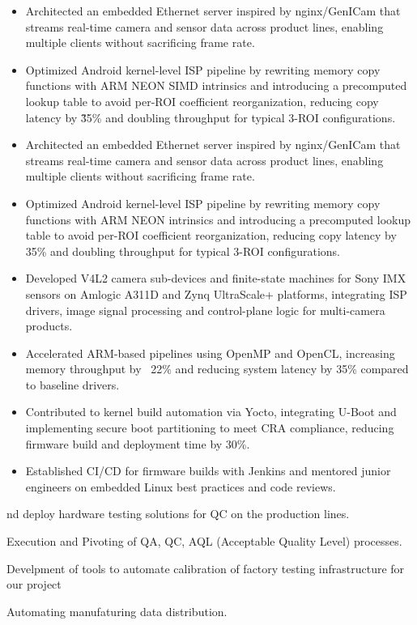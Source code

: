         \begin{itemize}
\item Architected an embedded Ethernet server inspired by nginx/GenICam that streams real-time camera and sensor data across product lines, enabling multiple clients without sacrificing frame rate.
\item Optimized Android kernel-level ISP pipeline by rewriting memory copy functions with ARM NEON SIMD intrinsics and introducing a precomputed lookup table to avoid per-ROI coefficient reorganization, reducing copy latency by \~35\% and doubling throughput for typical 3-ROI configurations.
    \item Architected an embedded Ethernet server inspired by nginx/GenICam that streams real-time camera and sensor data across product lines, enabling multiple clients without sacrificing frame rate.
    \item Optimized Android kernel-level ISP pipeline by rewriting memory copy functions with ARM NEON intrinsics and introducing a precomputed lookup table to avoid per-ROI coefficient reorganization, reducing copy latency by 35\% and doubling throughput for typical 3-ROI configurations.
    \item Developed V4L2 camera sub-devices and finite-state machines for Sony IMX sensors on Amlogic A311D and Zynq UltraScale+ platforms, integrating ISP drivers, image signal processing and control-plane logic for multi-camera products.
    \item Accelerated ARM-based pipelines using OpenMP and OpenCL, increasing memory throughput by ~22\% and reducing system latency by 35\% compared to baseline drivers.
    \item Contributed to kernel build automation via Yocto, integrating U-Boot and implementing secure boot partitioning to meet CRA compliance, reducing firmware build and deployment time by 30\%.
    \item Established CI/CD for firmware builds with Jenkins and mentored junior engineers on embedded Linux best practices and code reviews.
    \end{itemize}
nd deploy hardware testing solutions for QC on the production lines.
                \item Execution and Pivoting of QA, QC, AQL (Acceptable Quality Level) processes.
                \item Develpment of tools to automate calibration of factory testing infrastructure for our project
                \item Automating manufaturing data distribution.
